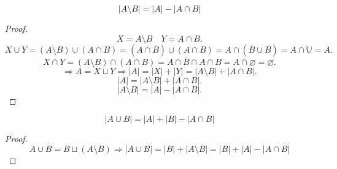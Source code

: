 \begin{theorem}
    $$|A \setminus B| = |A| - |A \cap B|$$
\end{theorem}
\begin{proof}
    \begin{equation*}
        X = A \setminus B \quad Y = A \cap B.
    \end{equation*}
    \begin{equation*}
        X \cup Y = (A \setminus B) \cup (A \cap B)
        = (A \cap \overline{B}) \cup (A \cap B)
        = A \cap (\overline{B} \cup B)
        = A \cap \mathbb{U}
        = A.
    \end{equation*}
    \begin{equation*}
        X \cap Y = (A \setminus B) \cap (A \cap B)
        = A \cap \overline{B} \cap A \cap B
        = A \cap \varnothing
        = \varnothing.
    \end{equation*}
    \begin{equation*}
        \Rightarrow A = X \sqcup Y \Rightarrow |A| = |X| + |Y| = |A \setminus B| + |A \cap B|.
    \end{equation*}
    \begin{equation*}
        |A| = |A \setminus B| + |A \cap B|.
    \end{equation*}
    \begin{equation*}
        |A \setminus B| = |A| - |A \cap B|.
    \end{equation*}
\end{proof}

\begin{theorem}
    $$|A \cup B| = |A| + |B| - |A \cap B|$$
\end{theorem}
\begin{proof}
    $$A \cup B
    = B \sqcup (A \setminus B) \Rightarrow |A \cup B|
    = |B| + |A \setminus B|
    = |B| + |A| - |A \cap B|$$
\end{proof}

